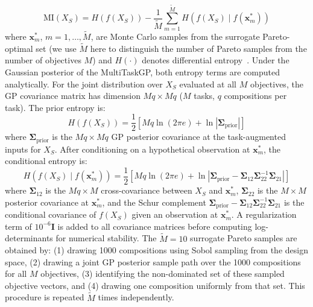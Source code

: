 \begin{itemize}
    \begin{equation}
    \label{eq:mi}
    \mathrm{MI}(X_S) = H\!\left(f(X_S)\right)
        - \frac{1}{\tilde{M}} \sum_{m=1}^{\tilde{M}} H\!\left(f(X_S) \mid f(\mathbf{x}^*_m)\right)
    \end{equation}
    where $\mathbf{x}^*_m$, $m = 1, \ldots, \tilde{M}$, are Monte Carlo samples from the surrogate Pareto-optimal set (we use $\tilde{M}$ here to distinguish the number of Pareto samples from the number of objectives $M$) and $H(\cdot)$ denotes differential entropy~\citep{Cover2006}. Under the Gaussian posterior of the MultiTaskGP, both entropy terms are computed analytically. For the joint distribution over $X_S$ evaluated at all $M$ objectives, the GP covariance matrix has dimension $Mq \times Mq$ ($M$ tasks, $q$ compositions per task). The prior entropy is:
    \begin{equation}
    \label{eq:prior-entropy}
    H\!\left(f(X_S)\right)
        = \frac{1}{2}\!\left[ Mq\ln(2\pi e) + \ln \left|\boldsymbol{\Sigma}_\mathrm{prior}\right| \right]
    \end{equation}
    where $\boldsymbol{\Sigma}_\mathrm{prior}$ is the $Mq \times Mq$ GP posterior covariance at the task-augmented inputs for $X_S$. After conditioning on a hypothetical observation at $\mathbf{x}^*_m$, the conditional entropy is:
    \begin{equation}
    \label{eq:cond-entropy}
    H\!\left(f(X_S) \mid f(\mathbf{x}^*_m)\right)
        = \frac{1}{2}\!\left[ Mq\ln(2\pi e)
            + \ln \left|\boldsymbol{\Sigma}_\mathrm{prior}
                - \boldsymbol{\Sigma}_{12}\boldsymbol{\Sigma}_{22}^{-1}\boldsymbol{\Sigma}_{21}
            \right| \right]
    \end{equation}
    where $\boldsymbol{\Sigma}_{12}$ is the $Mq \times M$ cross-covariance between $X_S$ and $\mathbf{x}^*_m$, $\boldsymbol{\Sigma}_{22}$ is the $M \times M$ posterior covariance at $\mathbf{x}^*_m$, and the Schur complement $\boldsymbol{\Sigma}_\mathrm{prior} - \boldsymbol{\Sigma}_{12}\boldsymbol{\Sigma}_{22}^{-1}\boldsymbol{\Sigma}_{21}$ is the conditional covariance of $f(X_S)$ given an observation at $\mathbf{x}^*_m$. A regularization term of $10^{-6}\mathbf{I}$ is added to all covariance matrices before computing log-determinants for numerical stability. The $\tilde{M} = 10$ surrogate Pareto samples are obtained by: (1) drawing 1000 compositions using Sobol sampling from the design space, (2) drawing a joint GP posterior sample path over the 1000 compositions for all $M$ objectives, (3) identifying the non-dominated set of these sampled objective vectors, and (4) drawing one composition uniformly from that set. This procedure is repeated $\tilde{M}$ times independently.


\end{itemize}
